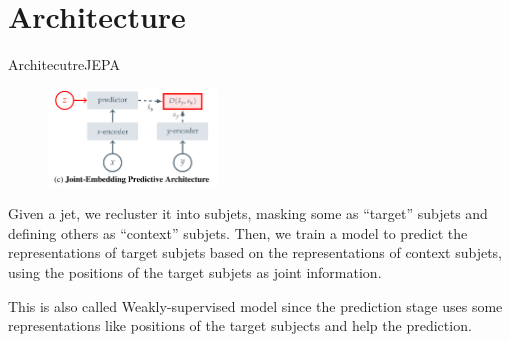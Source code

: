 \documentclass[10pt]{beamer}
\begin{document}
\section{Architecture}
\begin{frame}{Architecutre}{JEPA}

\begin{figure}
  \includegraphics[width=0.4\textwidth]{jepa.png}
\end{figure}

Given a jet, we recluster it into subjets, masking some
as “target” subjets and defining others as “context” subjets. Then, we train a model to predict the
representations of target subjets based on the representations of context subjets, using the positions of
the target subjets as joint information.

This is also called Weakly-supervised model since the prediction stage uses some representations like
positions of the target subjects and help the prediction.

\end{frame}
\end{document}
